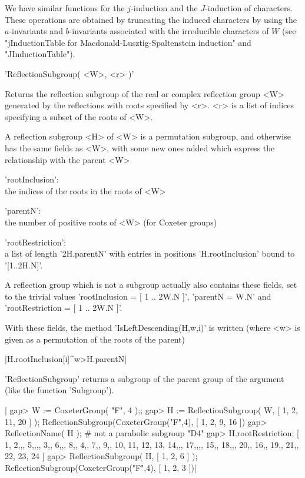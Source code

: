 We have similar functions for  the $j$-induction and the $J$-induction of
characters. These operations   are obtained  by truncating  the   induced
characters by using the $a$-invariants and $b$-invariants associated with
the   irreducible  characters     of  $W$  (see    "jInductionTable for
Macdonald-Lusztig-Spaltenstein induction" and "JInductionTable").


'ReflectionSubgroup( <W>, <r> )'

Returns the reflection subgroup of  the real or complex reflection group
<W> generated by  the reflections with roots specified by  <r>. <r> is a
list of indices specifying a subset of the roots of <W>.

A  reflection  subgroup  <H>  of  <W> is  a  permutation  subgroup,  and
otherwise has  the same fields  as <W>, with  some new ones  added which
express the relationship with the parent <W>\:

  'rootInclusion':\\ the indices of the roots in the roots of <W>

  'parentN':\\ the number of positive roots of <W> (for Coxeter groups)

  'rootRestriction':\\ a list of length   '2\*H.parentN' with entries  in
      positions 'H.rootInclusion' bound to '[1..2\*H.N]'.

A reflection group which is not  a subgroup actually also contains these
fields, set to  the trivial values\: 'rootInclusion = [  1 .. 2\*W.N ]',
'parentN = W.N' and 'rootRestriction = [ 1 .. 2\*W.N ]'.

With  these  fields,  the method  'IsLeftDescending(H,w,i)'  is  written
(where <w> is given as a permutation of the roots of the parent)

|H.rootInclusion[i]^w>H.parentN|

'ReflectionSubgroup' returns a subgroup    of  the parent group  of   the
argument (like the {\GAP} function 'Subgroup').


|    gap> W := CoxeterGroup( "F", 4 );;
    gap> H := ReflectionSubgroup( W, [ 1, 2, 11, 20 ] );
    ReflectionSubgroup(CoxeterGroup("F",4), [ 1, 2, 9, 16 ])
    gap> ReflectionName( H );  # not a parabolic subgroup
    "D4"
    gap> H.rootRestriction;
    [ 1, 2,,, 5,,,, 3,, 6,,, 8,, 4,, 7,, 9,, 10, 11, 12, 13, 14,,, 17,,,,
      15,, 18,,, 20,, 16,, 19,, 21,, 22, 23, 24 ]
    gap> ReflectionSubgroup( H, [ 1, 2, 6 ] );
    ReflectionSubgroup(CoxeterGroup("F",4), [ 1, 2, 3 ])|

